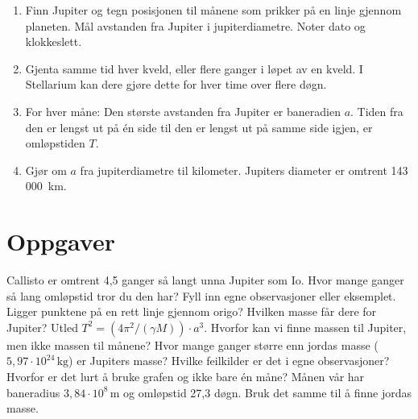 \documentclass[11pt]{article}
\begin{document}
\begin{enumerate}
\item Finn Jupiter og tegn posisjonen til månene som prikker på en linje gjennom planeten. Mål avstanden fra Jupiter i jupiterdiametre. Noter dato og klokkeslett.
\item Gjenta samme tid hver kveld, eller flere ganger i løpet av en kveld. I Stellarium kan dere gjøre dette for hver time over flere døgn.
\item For hver måne: Den største avstanden fra Jupiter er baneradien $a$. Tiden fra den er lengst ut på én side til den er lengst ut på samme side igjen, er omløpstiden $T$.
\item Gjør om $a$ fra jupiterdiametre til kilometer. Jupiters diameter er omtrent 143 000~km.
\end{enumerate}

\section*{Oppgaver}

\begin{oppgaveliste}
\oppgave {}Callisto er omtrent 4,5 ganger så langt unna Jupiter som Io. Hvor mange ganger så lang omløpstid tror du den har?
\svar
\oppgave {}Fyll inn egne observasjoner eller eksemplet. Ligger punktene på en rett linje gjennom origo? Hvilken masse får dere for Jupiter?
\svar
\oppgave {}Utled $T^{2} = (4π^{2}/(γM)) \cdot a^{3}$. Hvorfor kan vi finne massen til Jupiter, men ikke massen til månene?
\svar
\oppgave {}Hvor mange ganger større enn jordas masse ($5{,}97 \cdot 10^{24}\,\mathrm{kg}$) er Jupiters masse?
\svar
\oppgave {}Hvilke feilkilder er det i egne observasjoner? Hvorfor er det lurt å bruke grafen og ikke bare én måne?
\svar
\oppgave {}Månen vår har baneradius $3{,}84 \cdot 10^{8}\,\mathrm{m}$ og omløpstid 27,3 døgn. Bruk det samme til å finne jordas masse.
\svar
\end{oppgaveliste}
\end{document}
